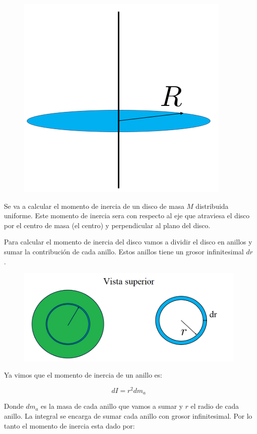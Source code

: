 \documentclass[a4paper,11pt]{article}
\begin{document}
\begin{figure}
	\includegraphics[scale=0.5]{./im/disc1}
\end{figure}

Se va a calcular el momento de inercia de un disco de masa $M$ distribuida uniforme. Este momento de inercia sera con respecto al eje que atraviesa el disco por el centro de masa (el centro) y perpendicular al plano del disco.


Para calcular el momento de inercia del disco vamos a dividir el disco en anillos y sumar la contribución de cada anillo. Estos anillos tiene un grosor infinitesimal $dr$. 
\vspace{2cm}
\begin{figure}[H]
	\includegraphics[width=\linewidth]{./im/disc2}
\end{figure}
\vspace{0.5cm}
Ya vimos que el momento de inercia de un anillo es:

$$ dI =  r^2 dm_a $$

Donde $dm_a$ es la masa de cada anillo que vamos a sumar y $r$ el radio de cada anillo. La integral se encarga de sumar cada anillo con grosor infinitesimal. Por lo tanto el momento de inercia esta dado por:
\end{document}
